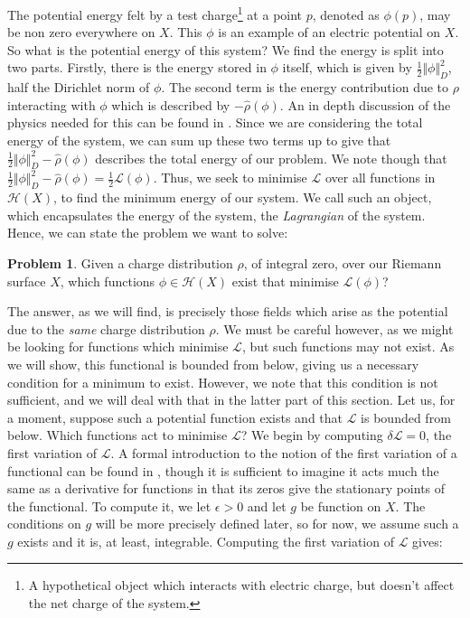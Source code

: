 \documentclass[11pt]{report}
\theoremstyle{definition}
\newtheorem*{problem}{Problem}
\begin{document}
The potential energy felt by a test charge\footnote{A hypothetical object which interacts with electric charge, but doesn't affect the net charge of the system.} at a point $p$, denoted as $\phi(p)$, may be non zero everywhere on $X$. This $\phi$ is an example of an electric potential on $X$. So what is the potential energy of this system? We find the energy is split into two parts. Firstly, there is the energy stored in $\phi$ itself, which is given by $\frac{1}{2}\Vert \phi \Vert^2_D$, half the Dirichlet norm of $\phi$. The second term is the energy contribution due to $\rho$ interacting with $\phi$ which is described by $-\hat{\rho}(\phi)$. An in depth discussion of the physics needed for this can be found in \cite[Chapter 1]{electromagentismBook}. Since we are considering the total energy of the system, we can sum up these two terms up to give that $\frac{1}{2}\Vert \phi \Vert^2_D - \hat{\rho}(\phi)$ describes the total energy of our problem. We note though that $\frac{1}{2}\Vert \phi \Vert^2_D - \hat{\rho}(\phi) = \frac{1}{2}\mathcal{L}(\phi)$. Thus, we seek to minimise $\mathcal{L}$ over all functions in $\mathcal{H}(X)$, to find the minimum energy of our system. We call such an object, which encapsulates the energy of the system, the \emph{Lagrangian} of the system. Hence, we can state the problem we want to solve:
\begin{problem}
  Given a charge distribution $\rho$, of integral zero, over our Riemann surface $X$, which functions $\phi \in \mathcal{H}(X)$ exist that minimise $\mathcal{L}(\phi)$?
\end{problem}
The answer, as we will find, is precisely those fields which arise as the potential due to the \emph{same} charge distribution $\rho$. We must be careful however, as we might be looking for functions which minimise $\mathcal{L}$, but such functions may not exist. As we will show, this functional is bounded from below, giving us a necessary condition for a minimum to exist. However, we note that this condition is not sufficient, and we will deal with that in the latter part of this section. Let us, for a moment, suppose such a potential function exists and that $\mathcal{L}$ is bounded from below. Which functions act to minimise $\mathcal{L}$? We begin by computing $\delta \mathcal{L}= 0 $, the first variation of $\mathcal{L}$. A formal introduction to the notion of the first variation of a functional can be found in \cite[p.4]{jost}, though it is sufficient to imagine it acts much the same as a derivative for functions in that its zeros give the stationary points of the functional. To compute it, we let $\epsilon > 0$ and let $g$ be function on $X$. The conditions on $g$ will be more precisely defined later, so for now, we assume such a $g$ exists and it is, at least, integrable. Computing the first variation of $\mathcal{L}$ gives:
\end{document}
